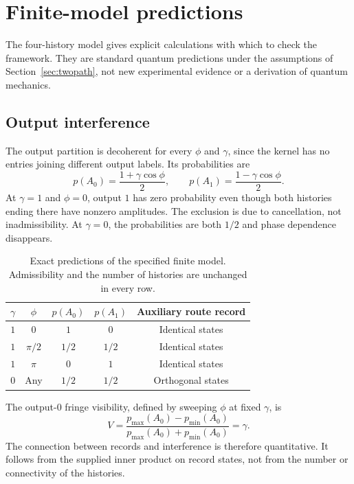 \section{Finite-model predictions}
\label{sec:toyresults}

The four-history model gives explicit calculations with which to check the
framework. They are standard quantum predictions under the assumptions of
Section~\ref{sec:twopath}, not new experimental evidence or a derivation of
quantum mechanics.

\subsection{Output interference}

The output partition is decoherent for every $\phi$ and $\gamma$, since
the kernel has no entries joining different output labels. Its probabilities
are
\begin{equation}
  p(A_0)=\frac{1+\gamma\cos\phi}{2},\qquad
  p(A_1)=\frac{1-\gamma\cos\phi}{2}.
  \label{eq:toyfringes}
\end{equation}
At $\gamma=1$ and $\phi=0$, output $1$ has zero probability even though
both histories ending there have nonzero amplitudes. The exclusion is due
to cancellation, not inadmissibility. At $\gamma=0$, the probabilities are
both $1/2$ and phase dependence disappears.

\begin{table}[ht]
  \centering
  \begin{tabular}{ccccc}
    \hline
    $\gamma$ & $\phi$ & $p(A_0)$ & $p(A_1)$ & Auxiliary route record\\
    \hline
    $1$ & $0$ & $1$ & $0$ & Identical states\\
    $1$ & $\pi/2$ & $1/2$ & $1/2$ & Identical states\\
    $1$ & $\pi$ & $0$ & $1$ & Identical states\\
    $0$ & Any & $1/2$ & $1/2$ & Orthogonal states\\
    \hline
  \end{tabular}
  \caption{Exact predictions of the specified finite model. Admissibility
  and the number of histories are unchanged in every row.}
  \label{tab:toyoutputs}
\end{table}

The output-$0$ fringe visibility, defined by sweeping $\phi$ at fixed
$\gamma$, is
\[
  V=\frac{p_{\max}(A_0)-p_{\min}(A_0)}
          {p_{\max}(A_0)+p_{\min}(A_0)}=\gamma.
\]
The connection between records and interference is therefore quantitative.
It follows from the supplied inner product on record states, not from
the number or connectivity of the histories.

